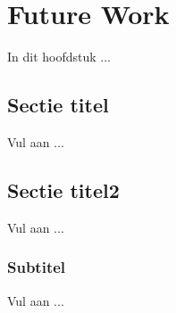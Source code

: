 \chapter{Future Work}

In dit hoofdstuk ...

\section{Sectie titel}

Vul aan ...

\section{Sectie titel2}

Vul aan ...

\subsection{Subtitel}
Vul aan ...
